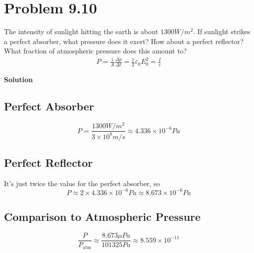 \documentclass[12pt]{article}
\newcommand{\enterProblemHeader}[1]{
	\rhead{#1}
}
\newenvironment{homeworkProblem}[1]{
    \section{Problem #1}
    \enterProblemHeader{#1}
}{
	\pagebreak
}
\newcommand{\solution}{\textbf{\large Solution}}
\begin{document}
\begin{homeworkProblem}{9.10}
	The intensity of sunlight hitting the earth is about $1300 \si{W/m^2}$. If
	sunlight strikes a perfect absorber, what pressure does it exert? How about
	a perfect reflector? What fraction of atmospheric pressure does this amount
	to?\\
	\begin{align*}
		P = \frac 1 A \frac {\Delta p} {\Delta t} = \frac 12 \varepsilon_0 E_0^2
		= \frac I c \tag{9.64}
	\end{align*}

	\solution

	\subsection{Perfect Absorber}
	\[
		P = \frac {1300 \si{W/m^2} } {3 \times 10^8 \si{m/s} } \approx 4.336
		\times 10^{-6} \si{Pa}
	\]
	\subsection{Perfect Reflector}

	It's just twice the value for the perfect absorber, so
	\[
		P \approx 2 \times 4.336 \times 10^{-6} \si{Pa} \approx 8.673 \times
		10^{-6} \si{Pa}
	\]
	\subsection{Comparison to Atmospheric Pressure}

	\[
		\frac P {P_\text{atm}} \approx \frac {8.673 \mu \si{Pa}} {101325
		\si{Pa}} \approx 8.559 \times 10^{-11}
	\]

\end{homeworkProblem}
\end{document}
